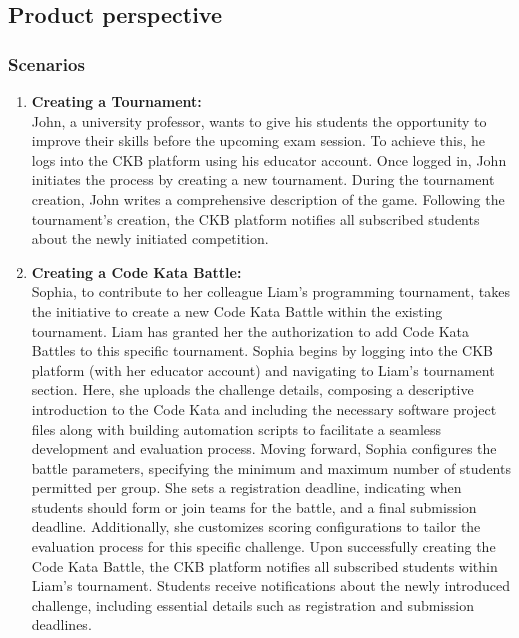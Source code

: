 \subsection{Product perspective}
\subsubsection{Scenarios}

\begin{enumerate}
   \item \textbf{Creating a Tournament:} \\
    John, a university professor, wants to give his students the opportunity to improve their skills before the upcoming exam session. To achieve this, he logs into the CKB platform using his educator account. Once logged in, John initiates the process by creating a new tournament.
    During the tournament creation, John writes a comprehensive description of the game. Following the tournament's creation, the CKB platform notifies all subscribed students about the newly initiated competition.
   

   \item \textbf{Creating a Code Kata Battle:} \\
Sophia, to contribute to her colleague Liam's programming tournament, takes the initiative to create a new Code Kata Battle within the existing tournament. Liam has granted her the authorization to add Code Kata Battles to this specific tournament.
Sophia begins by logging into the CKB platform (with her educator account) and navigating to Liam's tournament section. Here, she uploads the challenge details, composing a descriptive introduction to the Code Kata and including the necessary software project files along with building automation scripts to facilitate a seamless development and evaluation process. Moving forward, Sophia configures the battle parameters, specifying the minimum and maximum number of students permitted per group. She sets a registration deadline, indicating when students should form or join teams for the battle, and a final submission deadline. Additionally, she customizes scoring configurations to tailor the evaluation process for this specific challenge.
Upon successfully creating the Code Kata Battle, the CKB platform notifies all subscribed students within Liam's tournament. Students receive notifications about the newly introduced challenge, including essential details such as registration and submission deadlines.
 

\end{enumerate}
